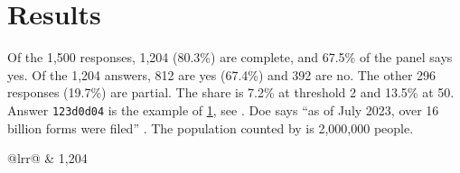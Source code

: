 \section{Results}
\label{sec:results-2}

Of the 1,500 responses, 1,204 (80.3\%) are complete, and 67.5\% of the panel says yes.
Of the 1,204 answers, 812 are yes (67.4\%) and 392 are no.
The other 296 responses (19.7\%) are partial.
The share is 7.2\% at threshold 2 and 13.5\% at 50.
Answer \texttt{123d0d04} is the example of \cref{sec:results-2}, see \cite[p.~107]{doe2001}.
Doe says ``as of July 2023, over 16 billion forms were filed'' \cite{doe2001}.
The population counted by \cite{census} is 2,000,000 people.
\begin{tabular}{@{}lrr@{}}
 & 1,204 \\
\end{tabular}
